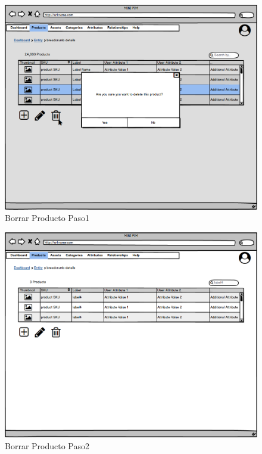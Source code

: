 \begin{figure}[H]
    \includegraphics[width=1\linewidth]{mockups/RF2-X Borrar Producto (Borrar Producto Paso1)V2.png}
    \caption{Borrar Producto Paso1}
   \end{figure}
\vspace{1.0cm}

\begin{figure}[H]
    \includegraphics[width=1\linewidth]{mockups/RF2-X Borrar Producto (Borrar Producto Paso2).png}
    \caption{Borrar Producto Paso2}
   \end{figure}
\vspace{1.0cm}

\newpage %